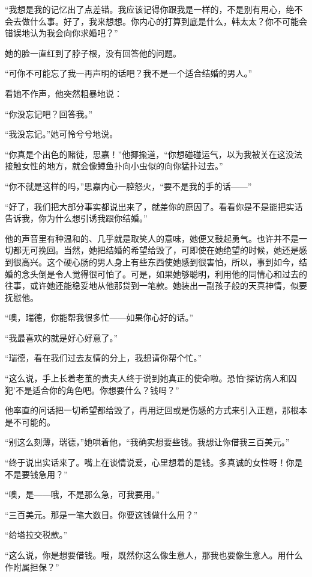 \par “我想是我的记忆出了点差错。我应该记得你跟我是一样的，不是别有用心，绝不会去做什么事。好了，我来想想。你内心的打算到底是什么，韩太太？你不可能会错误地认为我会向你求婚吧？”
\par 她的脸一直红到了脖子根，没有回答他的问题。
\par “可你不可能忘了我一再声明的话吧？我不是一个适合结婚的男人。”
\par 看她不作声，他突然粗暴地说：
\par “你没忘记吧？回答我。”
\par “我没忘记。”她可怜兮兮地说。
\par “你真是个出色的赌徒，思嘉！”他揶揄道，“你想碰碰运气，以为我被关在这没法接触女性的地方，就会像鳟鱼扑向小虫似的向你猛扑过去。”
\par “你不就是这样的吗，”思嘉内心一腔怒火，“要不是我的手的话——”
\par “好了，我们把大部分事实都说出来了，就差你的原因了。看看你是不是能把实话告诉我，你为什么想引诱我跟你结婚。”
\par 他的声音里有种温和的、几乎就是取笑人的意味，她便又鼓起勇气。也许并不是一切都无可挽回。当然，她把结婚的希望给毁了，可即使在她绝望的时候，她还是感到很高兴。这个硬心肠的男人身上有些东西使她感到很害怕，所以，事到如今，结婚的念头倒是令人觉得很可怕了。可是，如果她够聪明，利用他的同情心和过去的往事，或许她还能稳妥地从他那贷到一笔款。她装出一副孩子般的天真神情，似要抚慰他。
\par “噢，瑞德，你能帮我很多忙——如果你心好的话。”
\par “我最喜欢的就是好心好意了。”
\par “瑞德，看在我们过去友情的分上，我想请你帮个忙。”
\par “这么说，手上长着老茧的贵夫人终于说到她真正的使命啦。恐怕‘探访病人和囚犯’不是适合你的角色吧。你想要什么？钱吗？”
\par 他率直的问话把一切希望都给毁了，再用迂回或是伤感的方式来引入正题，那根本是不可能的。
\par “别这么刻薄，瑞德，”她哄着他，“我确实想要些钱。我想让你借我三百美元。”
\par “终于说出实话来了。嘴上在谈情说爱，心里想着的是钱。多真诚的女性呀！你是不是要钱急用？”
\par “噢，是——哦，不是那么急，可我要用。”
\par “三百美元。那是一笔大数目。你要这钱做什么用？”
\par “给塔拉交税款。”
\par “这么说，你是想要借钱。哦，既然你这么像生意人，那我也要像生意人。用什么作附属担保？”
